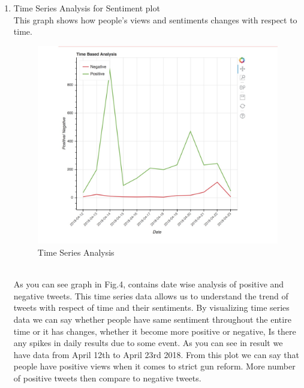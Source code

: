\documentclass[journal, a4paper]{IEEEtran}
\begin{document}
   \begin{enumerate}
  \item Time Series Analysis for Sentiment plot\\ This graph shows how people’s views and sentiments changes with respect to time.
  \begin{figure}[!hbt]
		\begin{center}
		\includegraphics[width=\columnwidth]{Screen_Shot_2018-05-01_at_7_17_45_PM}
%
		\caption{Time Series Analysis}
		\label{fig:tf_plot}
		\end{center}
	\end{figure}
    \\As you can see graph in Fig.4, contains date wise analysis of positive and negative tweets. This time series data allows us to understand the trend of tweets with respect of time and their sentiments. By visualizing time series data we can say whether people have same sentiment throughout the entire time or it has changes, whether it become more positive or negative,  Is there any spikes in daily results due to some event. As you can see in result we have data from April 12th to April 23rd 2018. From this plot we can say that people have positive views when it comes to strict gun reform. More number of positive tweets then compare to negative tweets.
  

\end{enumerate}
\end{document}

